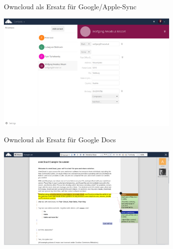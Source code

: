   \begin{frame}{Owncloud als Ersatz für Google/Apple-Sync}
    \begin{center}
      \includegraphics[width=9cm]{../../img/owncloud-contacts.png}
    \end{center}
  \end{frame}

  \begin{frame}{Owncloud als Ersatz für Google Docs}
    \begin{center}
      \includegraphics[width=9cm]{../../img/owncloud-documents.png}
    \end{center}
  \end{frame}

